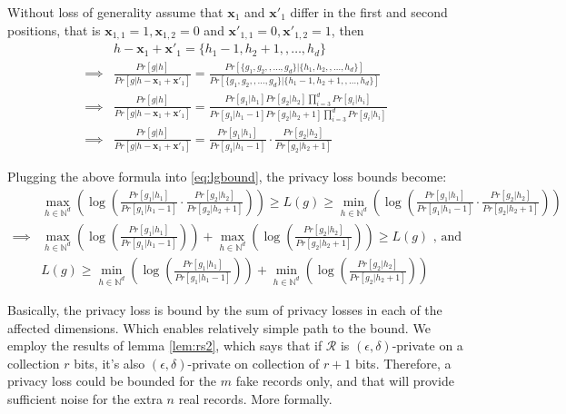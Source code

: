 \documentclass[11pt]{article}
\newcommand{\bbx}{\pmb{x}}
\newcommand{\cR}{\mathcal{R}}
\newcommand{\N}{\mathbb{N}}
\begin{document}
Without loss of generality assume that $\bbx_1$ and $\bbx'_1$ differ in the first and second positions, that is $\bbx_{1,1} = 1, \bbx_{1,2} = 0$ and $\bbx'_{1,1} = 0, \bbx'_{1,2} = 1$, then
\begin{align*}
 & h  - \bbx_1 + \bbx'_1 = \{ {h}_1 - 1, {h}_2 + 1, , \dots, {h}_d\} \\
 \implies &  \frac{  Pr [ g | h ]   } {    Pr [ g | h  - \bbx_1 + \bbx'_1  ]  } = \frac{ Pr [    \{ {g}_1, {g}_2, , \dots, {g}_d\} |  \{ {h}_1, {h}_2, , \dots, {h}_d\} ] } { Pr [    \{ {g}_1, {g}_2, , \dots, {g}_d\} |  \{ {h}_1 - 1, {h}_2 + 1, , \dots, {h}_d\} ]  } \\
  \implies &  \frac{  Pr [ g | h ]   } {    Pr [ g | h  - \bbx_1 + \bbx'_1  ]  } = \frac{  Pr[ g_1 | h_1] Pr[ g_2 | h_2] \prod_{i=3}^d Pr[ g_i | h_i]  } {  Pr[ g_1 | h_1 - 1] Pr[ g_2 | h_2 + 1] \prod_{i=3}^d Pr[ g_i | h_i]  }  \\
   \implies &  \frac{  Pr [ g | h ]   } {    Pr [ g | h  - \bbx_1 + \bbx'_1  ]  } =   \frac{  Pr[ g_1 | h_1]  } {  Pr[ g_1 | h_1 - 1]  } \cdot \frac{  Pr[ g_2 | h_2]  } {  Pr[ g_2 | h_2 + 1]  } 
\end{align*}

Plugging the above formula into \eqref{eq:lgbound}, the privacy loss bounds become:
\begin{align*}
& \max_{h \in \N^d}  \left ( \log \left (   \frac{  Pr[ g_1 | h_1]  } {  Pr[ g_1 | h_1 - 1]  } \cdot \frac{  Pr[ g_2 | h_2]  } {  Pr[ g_2 | h_2 + 1]  }  \right ) \right ) \ge L(g) \ge  \min_{h \in \N^d}  \left ( \log \left (  \frac{  Pr[ g_1 | h_1]  } {  Pr[ g_1 | h_1 - 1]  } \cdot \frac{  Pr[ g_2 | h_2]  } {  Pr[ g_2 | h_2 + 1]  }   \right ) \right ) \\
\implies &  \max_{h \in \N^d}  \left ( \log \left (   \frac{  Pr[ g_1 | h_1]  } {  Pr[ g_1 | h_1 - 1]  } \right ) \right )  + \max_{h \in \N^d}  \left ( \log  \left (\frac{  Pr[ g_2 | h_2]  } {  Pr[ g_2 | h_2 + 1]  }  \right) \right) \ge L(g) \text{ , and } \\
&  L(g) \ge \min_{h \in \N^d}  \left ( \log \left (   \frac{  Pr[ g_1 | h_1]  } {  Pr[ g_1 | h_1 - 1]  } \right ) \right )  + \min_{h \in \N^d}  \left ( \log  \left (\frac{  Pr[ g_2 | h_2]  } {  Pr[ g_2 | h_2 + 1]  }  \right) \right)
\end{align*}

Basically, the privacy loss is bound by the sum of privacy losses in each of the affected dimensions.  Which enables relatively simple path to the bound.   We employ the results of lemma \eqref{lem:rs2}, which says that if $\cR$ is $(\epsilon, \delta)$-private on a collection $r$ bits, it's also $(\epsilon, \delta)$-private on collection of $r+1$ bits.  Therefore, a privacy loss could be bounded for the $m$ fake records only, and that will provide sufficient noise for the extra $n$ real records.  More formally.
\end{document}
